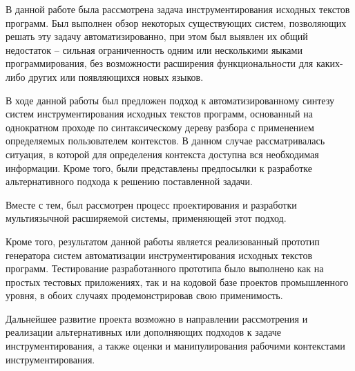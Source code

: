 \conclusion

В данной работе была рассмотрена задача инструментирования исходных текстов программ.
Был выполнен обзор некоторых существующих систем, позволяющих решать эту задачу автоматизированно, при этом был выявлен их общий недостаток -- сильная ограниченность одним или несколькими яыками программирования, без возможности расширения функциональности для каких-либо других или появляющихся новых языков.

В ходе данной работы был предложен подход к автоматизированному синтезу систем инструментирования исходных текстов программ, основанный на однократном проходе по синтаксическому дереву разбора с применением определяемых пользователем контекстов.
В данном случае рассматривалась ситуация, в которой для определения контекста доступна вся необходимая информации.
Кроме того, были представлены предпосылки к разработке альтернативного подхода к решению поставленной задачи.

Вместе с тем, был рассмотрен процесс проектирования и разработки мультиязычной расширяемой системы, применяющей этот подход.

Кроме того, результатом данной работы является реализованный прототип генератора систем автоматизации инструментирования исходных текстов программ.
Тестирование разработанного прототипа было выполнено как на простых тестовых приложениях, так и на кодовой базе проектов промышленного уровня, в обоих случаях продемонстрировав свою применимость.

Дальнейшее развитие проекта возможно в направлении рассмотрения и реализации альтернативных или дополняющих подходов к задаче инструментирования, а также оценки и манипулирования рабочими контекстами инструментирования.
